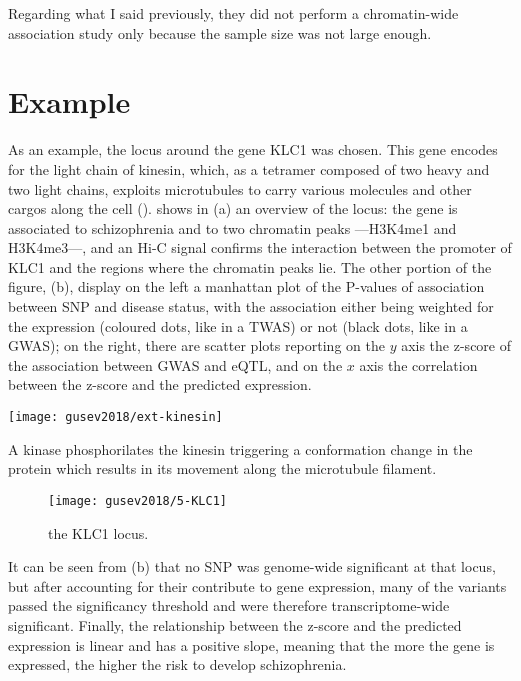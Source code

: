\documentclass[../main.tex]{subfiles}
\begin{document}
Regarding what I said previously, they did not perform a chromatin-wide 
association study only because the sample size was not large enough.

\section{Example}

As an example, the locus around the gene KLC1 was chosen. This gene 
encodes for the light chain of kinesin, which, as a tetramer composed of 
two heavy and two light chains, exploits microtubules to carry various 
molecules and other cargos along the cell (). 
 shows in (a) an overview of the locus: the gene is 
associated to schizophrenia and to two chromatin peaks ---H3K4me1 and 
H3K4me3---, and an Hi-C signal confirms the interaction between the 
promoter of KLC1 and the regions where the chromatin peaks lie. The 
other portion of the figure, (b), display on the left a manhattan plot 
of the P-values of association between SNP and disease status, with the 
association either being weighted for the expression (coloured dots, 
like in a TWAS) or not (black dots, like in a GWAS); on the right, there 
are scatter plots reporting on the $y$ axis the z-score of the 
association between GWAS and eQTL, and on the $x$ axis the correlation 
between the z-score and the predicted expression.

\begin{marginfigure}[-8cm]
	\texttt{[image: gusev2018/ext-kinesin]}
	\caption{A kinase phosphorilates the kinesin triggering a 
conformation change in the protein which results in its movement along 
the microtubule filament.}
\end{marginfigure}

\begin{figure}
	\texttt{[image: gusev2018/5-KLC1]}
	\caption{the KLC1 locus.}
\end{figure}

It can be seen from (b) that no SNP was genome-wide significant at that 
locus, but after accounting for their contribute to gene expression, 
many of the variants passed the significancy threshold and were 
therefore transcriptome-wide significant. Finally, the relationship 
between the z-score and the predicted expression is linear and has a 
positive slope, meaning that the more the gene is expressed, the higher 
the risk to develop schizophrenia.
\end{document}
